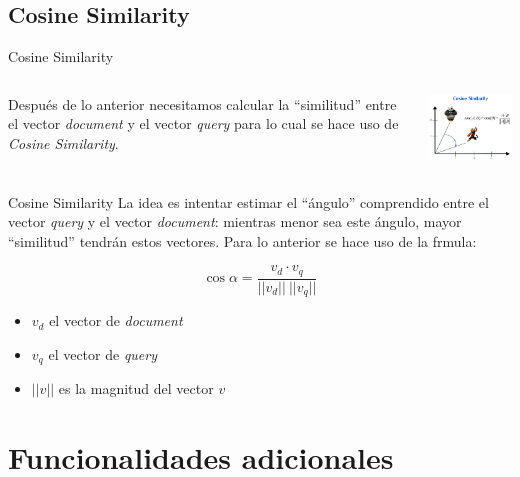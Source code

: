\documentclass{beamer}
\begin{document}
\subsection*{Cosine Similarity}

\begin{frame}{Cosine Similarity}
  \begin{columns}[T]
    \begin{column}[T]{6cm}
      Después de lo anterior necesitamos calcular la ``similitud'' entre el
      vector {\it document} y el vector {\it query} para lo cual se hace uso de {\it
          Cosine Similarity}.
    \end{column}
    \begin{column}[T]{5cm}
      \includegraphics[width=5cm]{images/cosine.png}
    \end{column}
  \end{columns}
\end{frame}

\begin{frame}{Cosine Similarity}
  La idea es intentar estimar el ``ángulo'' comprendido entre
  el vector {\it query} y el vector {\it document}: mientras menor sea este
  ángulo, mayor ``similitud'' tendrán estos vectores. Para lo anterior se hace
  uso de la frmula:

  \begin{equation}
    \cos \alpha = \frac{v_d \cdot v_q}{||v_d|| ~ ||v_q||} \nonumber
  \end{equation}

  \begin{itemize}
    \item $v_d$ el vector de {\it document}
    \item $v_q$ el vector de {\it query}
    \item $||v||$ es la magnitud del vector $v$
  \end{itemize}
\end{frame}

\section{Funcionalidades adicionales}
\end{document}
